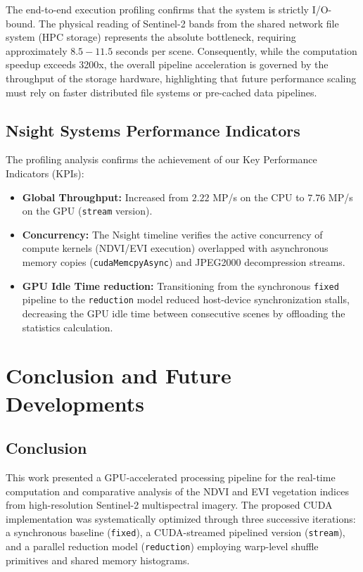 \documentclass[10pt,conference,compsoc]{IEEEtran}
\begin{document}
The end-to-end execution profiling confirms that the system is strictly I/O-bound. The physical reading of Sentinel-2 bands from the shared network file system (HPC storage) represents the absolute bottleneck, requiring approximately $8.5 - 11.5$ seconds per scene. Consequently, while the computation speedup exceeds 3200x, the overall pipeline acceleration is governed by the throughput of the storage hardware, highlighting that future performance scaling must rely on faster distributed file systems or pre-cached data pipelines.

\subsection{Nsight Systems Performance Indicators}
The profiling analysis confirms the achievement of our Key Performance Indicators (KPIs):
\begin{itemize}
    \item \textbf{Global Throughput:} Increased from $2.22$ MP/s on the CPU to $7.76$ MP/s on the GPU (\texttt{stream} version).
    \item \textbf{Concurrency:} The Nsight timeline verifies the active concurrency of compute kernels (NDVI/EVI execution) overlapped with asynchronous memory copies (\texttt{cudaMemcpyAsync}) and JPEG2000 decompression streams.
    \item \textbf{GPU Idle Time reduction:} Transitioning from the synchronous \texttt{fixed} pipeline to the \texttt{reduction} model reduced host-device synchronization stalls, decreasing the GPU idle time between consecutive scenes by offloading the statistics calculation.
\end{itemize}

\section{Conclusion and Future Developments}
\subsection{Conclusion}
This work presented a GPU-accelerated processing pipeline for the real-time computation and comparative analysis of the NDVI and EVI vegetation indices from high-resolution Sentinel-2 multispectral imagery. The proposed CUDA implementation was systematically optimized through three successive iterations: a synchronous baseline (\texttt{fixed}), a CUDA-streamed pipelined version (\texttt{stream}), and a parallel reduction model (\texttt{reduction}) employing warp-level shuffle primitives and shared memory histograms.
\end{document}
